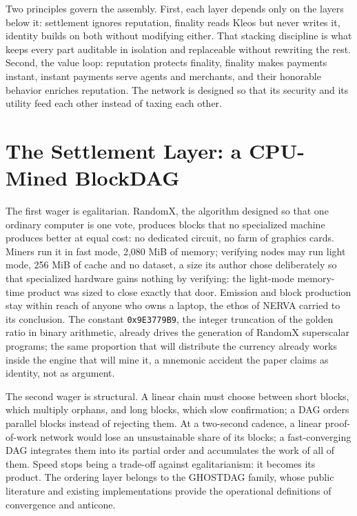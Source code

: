 Two principles govern the assembly. First, each layer depends only on the
layers below it: settlement ignores reputation, finality reads Kleos but
never writes it, identity builds on both without modifying either. That
stacking discipline is what keeps every part auditable in isolation and
replaceable without rewriting the rest. Second, the value loop: reputation
protects finality, finality makes payments instant, instant payments serve
agents and merchants, and their honorable behavior enriches reputation.
The network is designed so that its security and its utility feed each
other instead of taxing each other.

\section{The Settlement Layer: a CPU-Mined BlockDAG}\label{sec:settlement}

The first wager is egalitarian. RandomX, the algorithm designed so that one
ordinary computer is one vote, produces blocks that no specialized machine
produces better at equal cost: no dedicated circuit, no farm of graphics
cards. Miners run it in fast mode, 2,080 MiB of memory; verifying nodes
may run light mode, 256 MiB of cache and no dataset, a size its author
chose deliberately so that specialized hardware gains nothing by verifying:
the light-mode memory-time product was sized to close exactly that door.
Emission and block production stay within reach of anyone who owns
a laptop, the ethos of NERVA carried to its conclusion. The constant
\texttt{0x9E3779B9}, the integer truncation of the golden ratio in binary
arithmetic, already drives the generation of RandomX superscalar programs;
the same proportion that will distribute the currency already works inside
the engine that will mine it, a mnemonic accident the paper claims as
identity, not as argument.

The second wager is structural. A linear chain must choose between short
blocks, which multiply orphans, and long blocks, which slow confirmation;
a DAG orders parallel blocks instead of rejecting them. At a two-second
cadence, a linear proof-of-work network would lose an unsustainable share
of its blocks; a fast-converging DAG integrates them into its partial
order and accumulates the work of all of them. Speed stops being a
trade-off against egalitarianism: it becomes its product. The ordering
layer belongs to the GHOSTDAG family, whose public literature and existing
implementations provide the operational definitions of convergence and
anticone.

